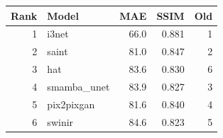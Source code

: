 \begin{tabular}{r l r r r}
\toprule
Rank & Model & MAE & SSIM & Old \\
\midrule
1 & i3net & 66.0 & 0.881 & 1 \\
2 & saint & 81.0 & 0.847 & 2 \\
3 & hat & 83.6 & 0.830 & 6 \\
4 & smamba\_unet & 83.9 & 0.827 & 3 \\
5 & pix2pixgan & 81.6 & 0.840 & 4 \\
6 & swinir & 84.6 & 0.823 & 5 \\
\bottomrule
\end{tabular}
